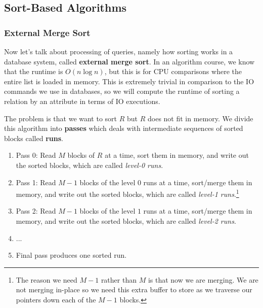 \subsection{Sort-Based Algorithms}

  \subsubsection{External Merge Sort}

    Now let's talk about processing of queries, namely how sorting works in a database system, called \textbf{external merge sort}. In an algorithm course, we know that the runtime is $O(n \log{n})$, but this is for CPU comparisons where the entire list is loaded in memory. This is extremely trivial in comparison to the IO commands we use in databases, so we will compute the runtime of sorting a relation by an attribute in terms of IO executions. 

    The problem is that we want to sort $R$ but $R$ does not fit in memory. We divide this algorithm into \textbf{passes} which deals with intermediate sequences of sorted blocks called \textbf{runs}. 
    \begin{enumerate}
      \item Pass 0: Read $M$ blocks of $R$ at a time, sort them in memory, and write out the sorted blocks, which are called \textit{level-0 runs}. 
      \item Pass 1: Read $M-1$ blocks of the level $0$ runs at a time, sort/merge them in memory, and write out the sorted blocks, which are called \textit{level-1 runs}.\footnote{The reason we need $M-1$ rather than $M$ is that now we are merging. We are not merging in-place so we need this extra buffer to store as we traverse our pointers down each of the $M-1$ blocks.}
      \item Pass 2: Read $M-1$ blocks of the level $1$ runs at a time, sort/merge them in memory, and write out the sorted blocks, which are called \textit{level-2 runs}. 
      \item ...  
      \item Final pass produces one sorted run. 
    \end{enumerate}

